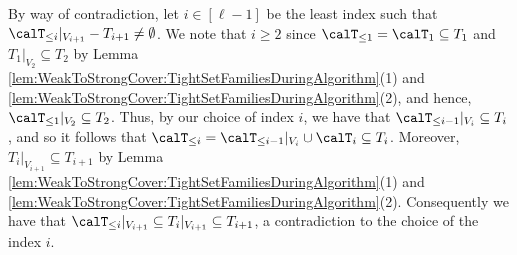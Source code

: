 \documentclass{article}
\newcommand{\zeros}{\ensuremath{\mathcal{Z}}\xspace}
\newcommand{\maximalTightSetFamily}[1]{\ensuremath{\calT_{#1}}\xspace}
\newcommand{\tightSetFamily}[1]{\ensuremath{T_{#1}}\xspace}
\newcommand{\cumulativeMaximalTightSetFamily}[1]{\ensuremath{\calT_{\leq #1}}}
\newcommand{\tightSetFamilyAfterReduce}[1]{\ensuremath{T_{#1}^R}\xspace}
\newcommand{\projTightSetFamilyAfterReduce}[2]{\ensuremath{T_{#1}^R|_{V_{#2}}}\xspace}
\begin{document}
        \item By way of contradiction, let $i \in [\ell - 1]$ be the least index such that $\cumulativeMaximalTightSetFamily{i}|_{V_{i+1}} - T_{i+1} \not = \emptyset$. We note that $i \geq 2$ since $\cumulativeMaximalTightSetFamily{1} = \maximalTightSetFamily{1}\subseteq T_1$ and $T_1|_{V_2}\subseteq T_2$ by Lemma  \ref{lem:WeakToStrongCover:TightSetFamiliesDuringAlgorithm}(1) and \ref{lem:WeakToStrongCover:TightSetFamiliesDuringAlgorithm}(2), and hence, $\cumulativeMaximalTightSetFamily{1}|_{V_2}\subseteq T_2$. Thus, by our choice of index $i$, we have that $\cumulativeMaximalTightSetFamily{i-1}|_{V_i} \subseteq \tightSetFamily{i}$, and so it follows that $\cumulativeMaximalTightSetFamily{i} = \cumulativeMaximalTightSetFamily{i-1}|_{V_i} \cup \maximalTightSetFamily{i} \subseteq \tightSetFamily{i}$. Moreover, $T_i|_{V_{i+1}}\subseteq T_{i+1}$ by Lemma  \ref{lem:WeakToStrongCover:TightSetFamiliesDuringAlgorithm}(1) and \ref{lem:WeakToStrongCover:TightSetFamiliesDuringAlgorithm}(2). Consequently we have that $\cumulativeMaximalTightSetFamily{i}|_{V_{i+1}} \subseteq \tightSetFamily{i}|_{V_{i+1}} \subseteq \tightSetFamily{i+1}$, a contradiction to the choice of the index $i$. 
\end{document}
